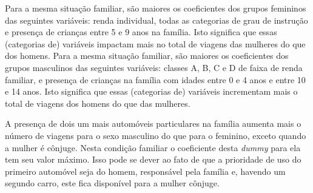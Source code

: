 Para a mesma situação familiar, são maiores os coeficientes dos grupos femininos das seguintes variáveis: 
renda individual, todas as categorias de grau de instrução e presença de crianças entre 5 e 9 anos na família.
Isto significa que essas (categorias de) variáveis impactam mais no total de viagens das mulheres do que dos homens.
Para a mesma situação familiar, são maiores os coeficientes dos grupos masculinos das seguintes variáveis: 
classes A, B, C e D de faixa de renda familiar, e presença de crianças na família com idades entre 0 e 4 anos e entre 10 e 14 anos.
Isto significa que essas (categorias de) variáveis incrementam mais o total de viagens dos homens do que das mulheres.

A presença de dois um mais automóveis particulares na família aumenta mais o número de viagens para o sexo masculino do que para o feminino, exceto quando a mulher é cônjuge. Nesta condição familiar o coeficiente desta \textit{dummy} para ela tem seu valor máximo.
Isso pode se dever ao fato de que a prioridade de uso do primeiro automóvel seja do homem, responsável pela família e, havendo um segundo carro, este fica disponível para a mulher cônjuge.

